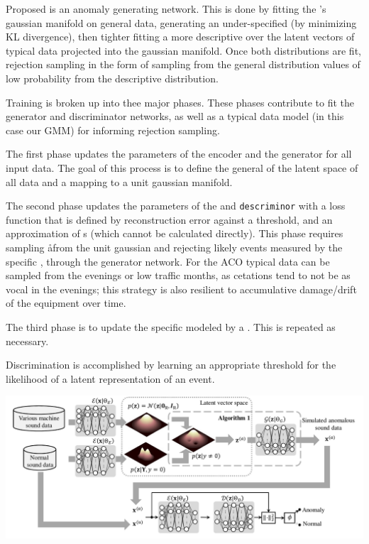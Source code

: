 \documentclass{article}
\begin{document}
\begin{multicols}{2}
Proposed is an anomaly generating network. This is done by fitting
the \vae{}'s gaussian manifold on general data, generating an under-specified \pdf (by
minimizing KL divergence), then tighter fitting a more descriptive \pdf
over the latent vectors of typical data projected into the gaussian manifold. Once both
distributions are fit, rejection sampling in the form of sampling from the general
distribution values of low probability from the descriptive distribution.

Training is broken up into thee major phases. These phases contribute to
fit the generator and discriminator networks, as well as a typical data model
(in this case our GMM) for informing rejection sampling.

The first phase updates the parameters of the encoder and the generator for all
input data. The goal of this process is to define the general \pdf of the latent
space of all data and a mapping to a unit gaussian manifold.


The second phase updates the parameters of the \encoder and \texttt{descriminor} with a
loss function that is defined by reconstruction error against a threshold,
and an approximation of \tfpr{}s (which cannot be calculated directly). This phase
requires sampling \aa from the unit gaussian and rejecting likely events measured by
the specific \pdf, through the generator network.
For the ACO typical data can be sampled from the evenings or low traffic months, as
cetations tend to not be as vocal in the evenings; this strategy is also resilient to
accumulative damage/drift of the equipment over time.

The third phase is to update the specific \pdf modeled by a \GMM. This is repeated as necessary.

Discrimination is accomplished by learning an appropriate threshold for the likelihood
of a latent representation of an event.
\end{multicols}

\includegraphics[width=\textwidth]{./model.png}
\end{document}
